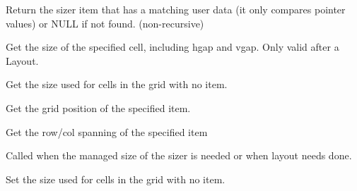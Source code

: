 Return the sizer item that has a matching user data (it only compares
pointer values) or NULL if not found. (non-recursive)

\label{wxgridbagsizergetcellsize}


Get the size of the specified cell, including hgap and vgap. Only
valid after a Layout.

\label{wxgridbagsizergetemptycellsize}


Get the size used for cells in the grid with no item.

\label{wxgridbagsizergetitemposition}




Get the grid position of the specified item.

\label{wxgridbagsizergetitemspan}




Get the row/col spanning of the specified item

\label{wxgridbagsizerrecalcsizes}


Called when the managed size of the sizer is needed or when layout
needs done.

\label{wxgridbagsizersetemptycellsize}


Set the size used for cells in the grid with no item.

\label{wxgridbagsizersetitemposition}

